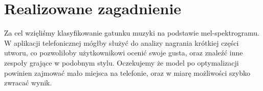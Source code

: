 \section{Realizowane zagadnienie}
Za cel wzięliśmy klasyfikowanie gatunku muzyki na podstawie mel-spektrogramu. W aplikacji telefonicznej mógłby służyć do analizy nagrania krótkiej części utworu, co pozwoliłoby użytkownikowi ocenić swoje gusta, oraz znaleźć inne zespoły grające w podobnym stylu. Oczekujemy że model po optymalizacji powinien zajmować mało miejsca na telefonie, oraz w miarę możliwości szybko zwracać wynik.
